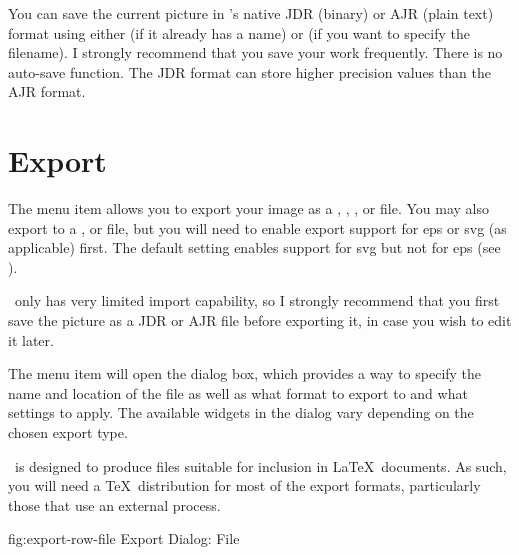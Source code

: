 
You can save the current picture in \FlowframTk's native
\gls{JDR} (binary) or \gls{AJR} (plain text) format using either
 (if it already has a name)
or  (if you want to specify the
filename).  I strongly recommend that you save your work frequently.
There is no auto-save function. The \gls{JDR} format can store
higher precision values than the \gls{AJR} format.

\section{Export}\label{sec:exportimage}


The  menu item allows you to export your image
as a , ,
,  or
 file. You may also export to a
,  or 
 file, but you will need to enable export support for
\gls{eps} or \gls{svg} (as applicable) first.
The default setting enables support for \gls{svg} but not for
\gls{eps} (see ). 

\begin{warning}
\FlowframTk\ only has very limited import capability, so I
strongly recommend that you first save the picture as a
\gls{JDR} or \gls{AJR} file before exporting it, in case you
wish to edit it later.
\end{warning}

The  menu item will open the 
dialog box, which provides a way to specify the name and location of
the file as well as what format to export to and what settings to
apply.  The available widgets in the dialog vary depending on the chosen export
type.

\begin{information}
\FlowframTk\ is designed to produce files suitable for inclusion in
\LaTeX\ documents. As such, you will need a \TeX\ distribution for
most of the export formats, particularly those that use an external
process.
\end{information}


\FloatFig
 {fig:export-row-file}
 {}
 {Export Dialog: File}

